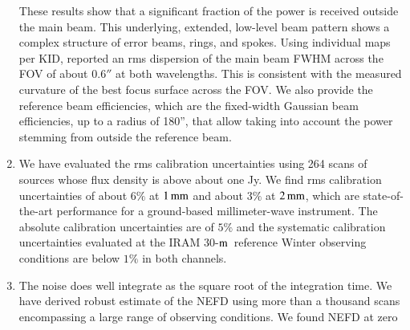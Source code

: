 \documentclass[traditionalabstract]{aa}
\newcommand{\bm}{{\tt beammap}}
\newcommand{\trentemetre}{30-$\rm{m}$}
\newcommand{\lp}[1]{#1}
\begin{document}
\begin{enumerate}
  {\lp These results show that a significant fraction of the power is received
    outside the main beam. This underlying,
    extended, low-level beam pattern shows a complex structure of error 
    beams, rings, and spokes.}
  Using individual maps per KID, \citet{Adam2018} reported an rms
  dispersion of the main beam FWHM across the FOV of about $0.6''$ at
  both wavelengths. This is consistent with the measured curvature of
  the best focus surface across the FOV. 
  {\lp We also provide the reference beam efficiencies, which are the
    fixed-width Gaussian beam efficiencies, up to a radius
    of 180'', that allow taking into account the power stemming from
    outside the reference beam.} %
%
  \vspace{1mm}
\item %
  We have evaluated the rms calibration uncertainties using 264 
  scans of sources whose flux density is above about one Jy. We find rms calibration
  uncertainties of about $6\%$ at $1\,\rm{mm}$ and about $3\%$ at
  $2\,\rm{mm}$, which are state-of-the-art performance for a
  ground-based millimeter-wave instrument. The absolute
  calibration uncertainties are of $5\%$ and the systematic
  calibration uncertainties evaluated at the IRAM
  \trentemetre\ reference Winter observing conditions are
  below $1\%$ in both channels.
   \vspace{1mm}
\item %
  The noise does well integrate as the square root of the integration time. We
  have derived robust estimate of the NEFD using more than a thousand scans
  encompassing a large range of observing conditions. We found NEFD at zero

\end{enumerate}
\end{document}
